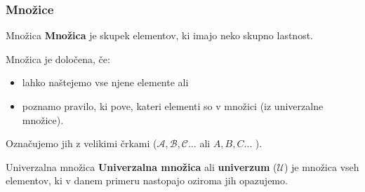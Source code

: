         \begin{frame}
            \frametitle{Množice}
            \begin{alertblock}{Množica}
                \textbf{Množica} je skupek elementov, ki imajo neko skupno lastnost.

            \end{alertblock}
            \begin{block}{}
                Množica je določena, če:
                \begin{itemize}
                    \item lahko naštejemo vse njene elemente ali
                    \item poznamo pravilo, ki pove, kateri elementi so v množici (iz univerzalne množice).
                \end{itemize}
            \end{block}
            \begin{block}{}
                Označujemo jih z velikimi črkami ($\mathcal{A}, \mathcal{B}, \mathcal{C} \dots$ ali  $A, B, C \dots$ ). 
            \end{block}

            \begin{alertblock}{Univerzalna množica}
                \textbf{Univerzalna množica} ali \textbf{univerzum} ($\mathcal{U}$) je množica 
                vseh elementov, ki v danem primeru nastopajo oziroma jih opazujemo.

            \end{alertblock}

        \end{frame}      

